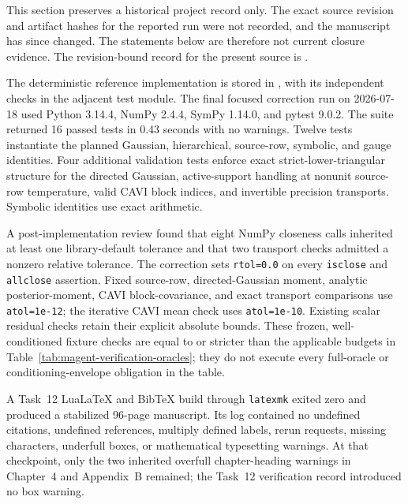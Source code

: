 This section preserves a historical project record only. The exact source revision and artifact hashes for the reported run were not recorded, and the manuscript has since changed. The statements below are therefore not current closure evidence. The revision-bound record for the present source is
\allowbreak
{}\allowbreak
{}.

The deterministic reference implementation is stored in
, with its
independent checks in the adjacent test module.  The final focused correction run on
2026-07-18 used Python 3.14.4, NumPy 2.4.4, SymPy 1.14.0, and pytest 9.0.2.
The suite returned 16 passed tests in 0.43 seconds with no warnings.  Twelve
tests instantiate the planned Gaussian, hierarchical, source-row, symbolic,
and gauge identities.  Four additional validation tests enforce exact
strict-lower-triangular structure for the directed Gaussian, active-support
handling at nonunit source-row temperature, valid CAVI block indices, and
invertible precision transports.  Symbolic identities use exact arithmetic.

A post-implementation review found that eight NumPy closeness calls inherited
at least one library-default tolerance and that two transport checks admitted
a nonzero relative tolerance.  The correction sets \texttt{rtol=0.0} on every
\texttt{isclose} and \texttt{allclose} assertion.  Fixed source-row,
directed-Gaussian moment, analytic posterior-moment, CAVI block-covariance, and
exact transport comparisons use \texttt{atol=1e-12}; the iterative CAVI mean
check uses \texttt{atol=1e-10}.  Existing scalar residual checks retain their
explicit absolute bounds.  These frozen, well-conditioned fixture checks are
equal to or stricter than the applicable budgets in
Table~\ref{tab:magent-verification-oracles}; they do not execute every
full-oracle or conditioning-envelope obligation in the table.

A Task~12 LuaLaTeX and BibTeX build through \texttt{latexmk} exited zero and
produced a stabilized 96-page manuscript.  Its log contained no undefined
citations, undefined references, multiply defined labels, rerun requests,
missing characters, underfull boxes, or mathematical typesetting warnings.
At that checkpoint, only the two inherited overfull chapter-heading warnings in
Chapter~4 and Appendix~B remained; the Task~12 verification record introduced
no box warning.


